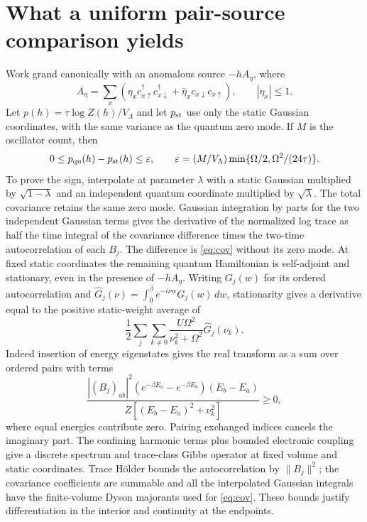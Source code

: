 \documentclass[11pt]{article}
\begin{document}
\section{What a uniform pair-source comparison yields}\label{app:pressure}
Work grand canonically with an anomalous source $-hA_\eta$, where
\[
 A_\eta=\sum_x(\eta_x c_{x\uparrow}^\dagger c_{x\downarrow}^\dagger
             +\bar\eta_x c_{x\downarrow}c_{x\uparrow}),\qquad |\eta_x|\le1.
\]
Let $p(h)=\tau\log Z(h)/V_\Lambda$ and let $p_{\rm st}$ use only the static Gaussian coordinates, with the same variance as the quantum zero mode. If $M$ is the oscillator count, then
\begin{equation}\label{eq:sandwich}
 0\le p_{\rm qu}(h)-p_{\rm st}(h)\le \varepsilon,
 \qquad \varepsilon=(M/V_\Lambda)\min\{\Omega/2,\Omega^2/(24\tau)\}.
\end{equation}
To prove the sign, interpolate at parameter $\lambda$ with a static Gaussian multiplied by $\sqrt{1-\lambda}$ and an independent quantum coordinate multiplied by $\sqrt\lambda$. The total covariance retains the same zero mode. Gaussian integration by parts for the two independent Gaussian terms gives the derivative of the normalized log trace as half the time integral of the covariance difference times the two-time autocorrelation of each $B_j$. The difference is \eqref{eq:cov} without its zero mode. At fixed static coordinates the remaining quantum Hamiltonian is self-adjoint and stationary, even in the presence of $-hA_\eta$. Writing $G_j(w)$ for its ordered autocorrelation and $\widehat G_j(\nu)=\int_0^\beta e^{-i\nu w}G_j(w)\,dw$, stationarity gives a derivative equal to the positive static-weight average of
\[
 \frac12\sum_j\sum_{k\ne0}\frac{U\Omega^2}{\nu_k^2+\Omega^2}\widehat G_j(\nu_k).
\]
Indeed insertion of energy eigenstates gives the real transform as a sum over ordered pairs with terms
\[
 \frac{|(B_j)_{ab}|^2 (e^{-\beta E_a}-e^{-\beta E_b})(E_b-E_a)}
 {Z[(E_b-E_a)^2+\nu_k^2]}\ge0,
\]
where equal energies contribute zero. Pairing exchanged indices cancels the imaginary part. The confining harmonic terms plus bounded electronic coupling give a discrete spectrum and trace-class Gibbs operator at fixed volume and static coordinates. Trace H\"older bounds the autocorrelation by $\|B_j\|^2$; the covariance coefficients are summable and all the interpolated Gaussian integrals have the finite-volume Dyson majorants used for \eqref{eq:cov}. These bounds justify differentiation in the interior and continuity at the endpoints.
\end{document}
